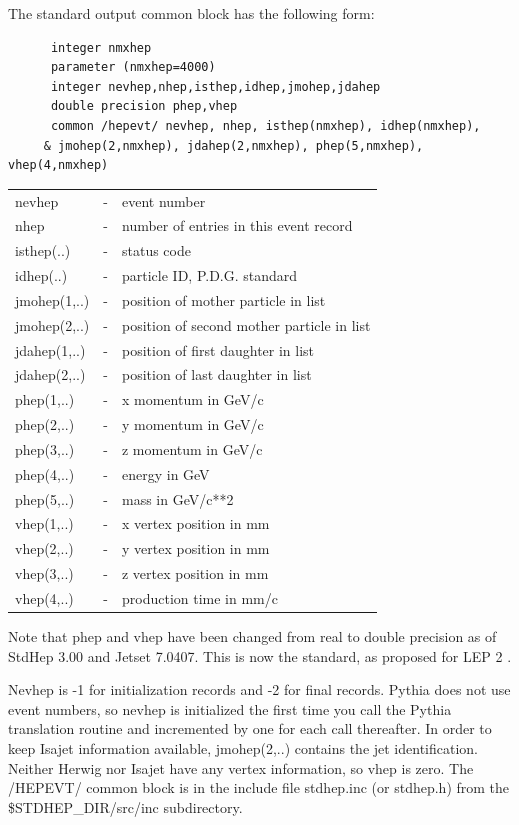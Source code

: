 \noindent The standard output common block has the following form:
\begin{verbatim}
      integer nmxhep
      parameter (nmxhep=4000)
      integer nevhep,nhep,isthep,idhep,jmohep,jdahep
      double precision phep,vhep
      common /hepevt/ nevhep, nhep, isthep(nmxhep), idhep(nmxhep),
     & jmohep(2,nmxhep), jdahep(2,nmxhep), phep(5,nmxhep), vhep(4,nmxhep)
\end{verbatim}
\begin{center}
\begin{tabular}{lcl}
nevhep      &-&event number \\
nhep        &-&number of entries in this event record \\
isthep(..)  &-&status code \\
idhep(..)   &-&particle ID, P.D.G. standard \\
jmohep(1,..)&-&position of mother particle in list \\
jmohep(2,..)&-&position of second mother particle in list \\
jdahep(1,..)&-&position of first daughter in list \\
jdahep(2,..)&-&position of last daughter in list \\
phep(1,..)  &-&x momentum in GeV/c \\
phep(2,..)  &-&y momentum in GeV/c \\
phep(3,..)  &-&z momentum in GeV/c \\
phep(4,..)  &-&energy in GeV \\
phep(5,..)  &-&mass in GeV/c**2\\
vhep(1,..)  &-&x vertex position in mm \\
vhep(2,..)  &-&y vertex position in mm \\
vhep(3,..)  &-&z vertex position in mm \\
vhep(4,..)  &-&production time in mm/c \\
\end{tabular}
\end{center}

Note that phep and vhep have been changed from real to double precision
as of StdHep 3.00 and Jetset 7.0407.
This is now the standard, as proposed for LEP 2 \cite{lund}.

Nevhep is -1 for initialization records and -2 for final records.
Pythia does not use event numbers, so nevhep is initialized the first time
you call the Pythia translation routine and incremented by one for
each call thereafter.
In order to keep Isajet information available, jmohep(2,..) contains the
jet identification.  Neither Herwig nor Isajet have any vertex information,
so vhep is zero.  The /HEPEVT/ common block is in
the include file stdhep.inc (or stdhep.h) from the \$STDHEP\_DIR/src/inc
subdirectory.

